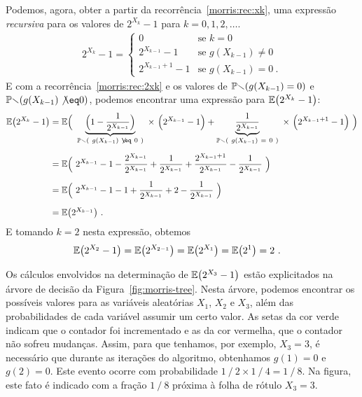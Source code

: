 Podemos, agora, obter a partir da recorrência~\eqref{morris:rec:xk}, uma expressão \textit{recursiva} para os valores de 
$2^{X_k} - 1$ para $k = 0,1,2,\dots$.
\begin{align}
  \label{morris:rec:2xk}
  2^{X_k}-1 = \begin{cases} 
  0                     & \mbox{se } k = 0 \\[2mm]
  2^{X_{k-1}} - 1       & \mbox{se } g(X_{k-1}) \neq 0 \\[2mm]
  2^{X_{k-1} + 1} - 1   & \mbox{se } g(X_{k-1}) =  0\ .  
\end{cases}
\end{align}
E com a recorrência~\eqref{morris:rec:2xk} e os valores de $\mathbb{Pr}(g(X_{k-1}) = 0)$ e $\Pbb(g(X_{k-1}) \not\eq 0)$, 
podemos encontrar uma expressão para $\mathbb{E}\big(2^{X_k} - 1\big)$:
\begin{align}
  \label{morris:rec:e}
  \Ebb\big(2^{X_k} - 1\big)
  &= \Ebb \Big( \ \underbrace{\Big(1 - \frac{1}{2^{X_{k-1}}}\Big)}_{\Pbb( \ g(X_{k-1}) \ \not\eq \ 0 \ )} \ \times \
  \Big( 2^{X_{k-1}}-1 \Big) + \underbrace{\frac{1}{2^{X_{k-1}}}}_{\Pbb( \ g(X_{k-1}) \ = \ 0 \ )} \ \times \
  \Big(2^{X_{k-1} + 1} - 1 \Big) \ \Big) \nonumber \\[2mm]
  &= \Ebb\Big(\ 2^{X_{k-1}} - 1 - \frac{2^{X_{k-1}}}{2^{X_{k-1}}} + \frac{1}{2^{X_{k-1}}}  + 
  \frac{2^{X_{k-1} + 1}}{2^{X_{k-1}}}  - \frac{1}{2^{X_{k-1}}} \ \Big) \nonumber \\[2mm]
  & = \Ebb\Big(\ 2^{X_{k-1}} - 1 - 1 + \frac{1}{2^{X_{k-1}}}  + 2  - \frac{1}{2^{X_{k-1}}} \ \Big) \nonumber \\[2mm]
  & = \Ebb\big( 2^{X_{k-1}}  \big) \ .
\end{align}
E tomando $k = 2$ nesta expressão, obtemos
\begin{align*}
  \mathbb{E}\big(2^{X_2}-1\big) & =  \mathbb{E}\big(2^{X_{2-1}}\big) = \mathbb{E}\big(2^{X_{1}}\big) = \mathbb{E}\big(2^{{1}}\big) = 2 \ . 
\end{align*}

Os cálculos envolvidos na determinação de $\mathbb{E}\big(2^{X_3} - 1\big)$ estão explicitados na árvore de decisão da 
Figura~\ref{fig:morris-tree}. Nesta árvore, podemos encontrar os possíveis valores para as variáveis aleatórias $X_1$, 
$X_2$ e $X_3$, além das probabilidades de cada variável assumir um certo valor. As setas da cor verde indicam que o 
contador foi incrementado e as da cor vermelha, que o contador não sofreu mudanças. Assim, para que tenhamos, por 
exemplo, $X_3 = 3$, é necessário que durante as iterações do algoritmo, obtenhamos $g(1) = 0$ e $g(2) = 0$. Este evento 
ocorre com probabilidade $1 \mathbin{/} 2 \times 1 \mathbin{/} 4 = 1 \mathbin{/} 8$. Na figura, este fato é indicado com 
a fração $1 \mathbin{/} 8$ próxima à folha de rótulo $X_3 = 3$.


